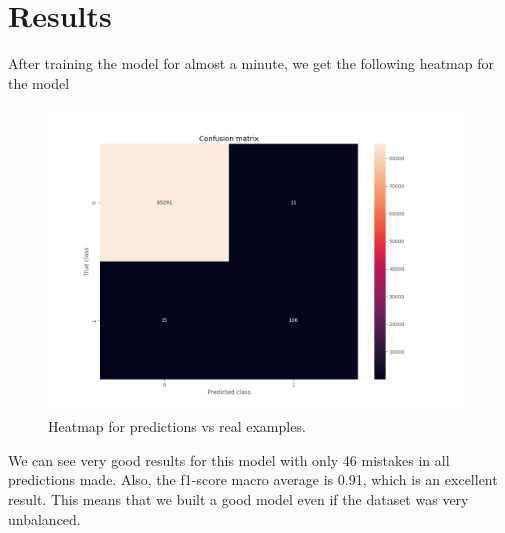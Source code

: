\documentclass[10pt]{article}
\begin{document}
\newpage
\section{Results}
After training the model for almost a minute, we get the following heatmap for the model
\begin{figure}[h]
    \centering
    \includegraphics[width=110mm]{heatmap.png}
    \caption{Heatmap for predictions vs real examples.}
\end{figure}
We can see very good results for this model with only 46 mistakes in all predictions made. Also, the f1-score macro average is 0.91, which is an excellent result. This means that we built a good model even if the dataset was very unbalanced.
\end{document}
